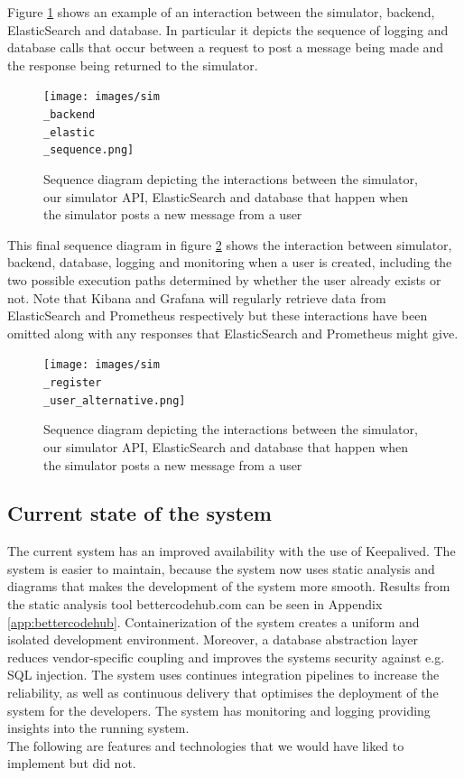 Figure \ref{fig:SequenceDiagramElasticBackendSim} shows an example of an interaction between the simulator, backend, ElasticSearch and database. In particular it depicts the sequence of logging and database calls that occur between a request to post a message being made and the response being returned to the simulator.

\begin{figure}[H]
 \centering
 \texttt{[image: images/sim\\\_backend\\\_elastic\\\_sequence.png]}
 \caption{Sequence diagram depicting the interactions between the simulator, our simulator API, ElasticSearch and database that happen when the simulator posts a new message from a user}
 \label{fig:SequenceDiagramElasticBackendSim}
\end{figure}

This final sequence diagram in figure \ref{fig:SequenceDiagramSimRegisterAlternative} shows the interaction between simulator, backend, database, logging and monitoring when a user is created, including the two possible execution paths determined by whether the user already exists or not.
Note that Kibana and Grafana will regularly retrieve data from ElasticSearch and Prometheus respectively but these interactions have been omitted along with any responses that ElasticSearch and Prometheus might give. 
\begin{figure}[H]
 \centering
 \texttt{[image: images/sim\\\_register\\\_user\_alternative.png]}
 \caption{Sequence diagram depicting the interactions between the simulator, our simulator API, ElasticSearch and database that happen when the simulator posts a new message from a user}
 \label{fig:SequenceDiagramSimRegisterAlternative}
\end{figure}

\subsection{Current state of the system}
The current system has an improved availability with the use of Keepalived. The system is easier to maintain, because the system now uses static analysis and diagrams that makes the development of the system more smooth. 
Results from the static analysis tool bettercodehub.com can be seen in Appendix \ref{app:bettercodehub}.
Containerization of the system creates a uniform and isolated development environment. 
Moreover, a database abstraction layer reduces vendor-specific coupling and improves the systems security against e.g. SQL injection.  
The system uses continues integration pipelines to increase the reliability, as well as continuous delivery that optimises the deployment of the system for the developers. The system has monitoring and logging providing insights into the running system.  
\\
The following are features and technologies that we would have liked to implement but did not.

